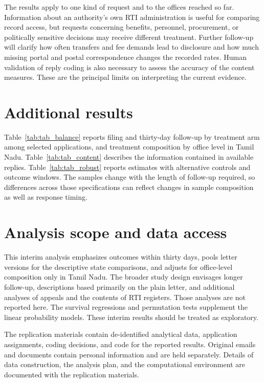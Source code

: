 \documentclass[11pt]{article}
\begin{document}
The results apply to one kind of request and to the offices reached so far. Information about an authority's own RTI administration is useful for comparing record access, but requests concerning benefits, personnel, procurement, or politically sensitive decisions may receive different treatment. Further follow-up will clarify how often transfers and fee demands lead to disclosure and how much missing portal and postal correspondence changes the recorded rates. Human validation of reply coding is also necessary to assess the accuracy of the content measures. These are the principal limits on interpreting the current evidence.




\clearpage
\appendix
{}
\renewcommand{\thetable}{\thesection\arabic{table}}
\renewcommand{\thefigure}{\thesection\arabic{figure}}
\section{Additional results}
Table~\ref{tab:tab_balance} reports filing and thirty-day follow-up by treatment arm among selected applications, and treatment composition by office level in Tamil Nadu. Table~\ref{tab:tab_content} describes the information contained in available replies. Table~\ref{tab:tab_robust} reports estimates with alternative controls and outcome windows. The samples change with the length of follow-up required, so differences across those specifications can reflect changes in sample composition as well as response timing.

\FloatBarrier

\FloatBarrier

\FloatBarrier

\section{Analysis scope and data access}
This interim analysis emphasizes outcomes within thirty days, pools letter versions for the descriptive state comparisons, and adjusts for office-level composition only in Tamil Nadu. The broader study design envisages longer follow-up, descriptions based primarily on the plain letter, and additional analyses of appeals and the contents of RTI registers. Those analyses are not reported here. The survival regressions and permutation tests supplement the linear probability models. These interim results should be treated as exploratory.

The replication materials contain de-identified analytical data, application assignments, coding decisions, and code for the reported results. Original emails and documents contain personal information and are held separately. Details of data construction, the analysis plan, and the computational environment are documented with the replication materials.
\end{document}

